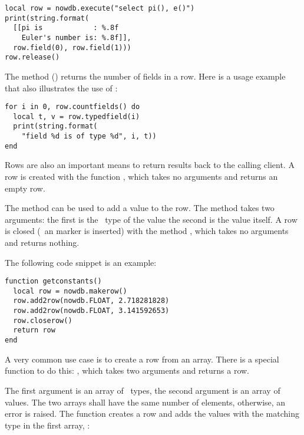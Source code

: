\begin{lua}
\begin{lstlisting}
local row = nowdb.execute("select pi(), e()")
print(string.format(
  [[pi is            : %.8f
    Euler's number is: %.8f]],
  row.field(0), row.field(1)))
row.release()
\end{lstlisting}
\end{lua}

The method () returns
the number of fields in a row.
Here is a usage example that also
illustrates the use of :

\begin{lua}
\begin{lstlisting}
for i in 0, row.countfields() do
  local t, v = row.typedfield(i)
  print(string.format(
    "field %d is of type %d", i, t))
end
\end{lstlisting}
\end{lua}

Rows are also an important means to return 
results back to the calling client.
A row is created with the function
, which takes
no arguments and returns an empty row.

The method  can
be used to add a value to the row.
The method takes two arguments:
the first is the \nowdb\ type of the value
the second is the value itself.
A row is closed (\ie\ an  marker
is inserted) with the method
, which takes no arguments
and returns nothing.

The following code snippet is an example:

\begin{lua}
\begin{lstlisting}
function getconstants()
  local row = nowdb.makerow()
  row.add2row(nowdb.FLOAT, 2.718281828)
  row.add2row(nowdb.FLOAT, 3.141592653)
  row.closerow()
  return row
end
\end{lstlisting}
\end{lua}

A very common use case is to create a row from
an array. There is a special function to do this:
, which takes two arguments
and returns a row.

The first argument is an array of \nowdb\ types,
the second argument is an array of values.
The two arrays shall have the same number
of elements, otherwise, an error is raised.
The function creates a row and adds the values
with the matching type in the first array, \eg:

